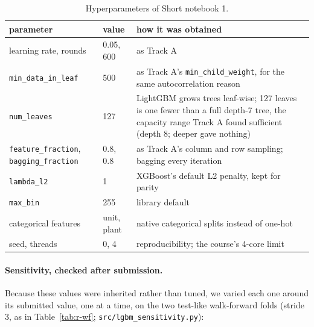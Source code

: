 \documentclass[11pt]{article}
\begin{document}
\begin{table}[H]
\centering\small
\begin{tabularx}{\linewidth}{L{4.3cm}L{1.9cm}Y}
\toprule
parameter & value & how it was obtained \\
\midrule
learning rate, rounds & 0.05, 600 & as Track A \\
\texttt{min\_data\_in\_leaf} & 500 & as Track A's \texttt{min\_child\_weight}, for the same autocorrelation reason \\
\texttt{num\_leaves} & 127 & LightGBM grows trees leaf-wise; 127 leaves is one fewer than a full depth-7 tree,
  the capacity range Track A found sufficient (depth 8; deeper gave nothing) \\
\texttt{feature\_fraction}, \texttt{bagging\_fraction} & 0.8, 0.8 & as Track A's column and row sampling;
  bagging every iteration \\
\texttt{lambda\_l2} & 1 & XGBoost's default L2 penalty, kept for parity \\
\texttt{max\_bin} & 255 & library default \\
categorical features & unit, plant & native categorical splits instead of one-hot \\
seed, threads & 0, 4 & reproducibility; the course's 4-core limit \\
\bottomrule
\end{tabularx}
\caption{Hyperparameters of Short notebook 1.}
\end{table}

\paragraph{Sensitivity, checked after submission.} Because these values were inherited rather than
tuned, we varied each one around its submitted value, one at a time, on the two test-like
walk-forward folds (stride 3, as in Table~\ref{tab:r-wf}; \texttt{src/lgbm\_sensitivity.py}):
\end{document}
